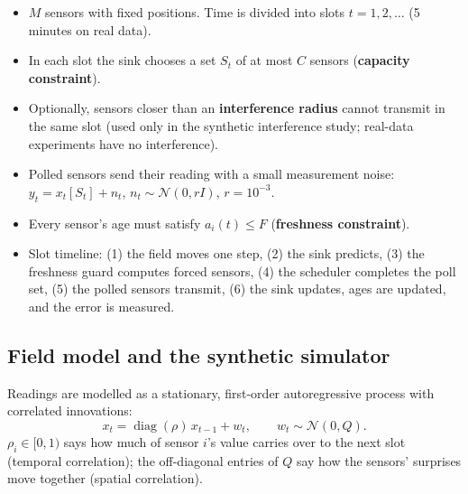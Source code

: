 \begin{itemize}
  \item $M$ sensors with fixed positions. Time is divided into slots $t=1,2,\dots$ (5 minutes on real data).
  \item In each slot the sink chooses a set $S_t$ of at most $C$ sensors (\textbf{capacity constraint}).
  \item Optionally, sensors closer than an \textbf{interference radius} cannot transmit in the same slot (used only in
        the synthetic interference study; real-data experiments have no interference).
  \item Polled sensors send their reading with a small measurement noise: $y_t = x_t[S_t] + n_t$,
        $n_t\sim\mathcal N(0,rI)$, $r=10^{-3}$.
  \item Every sensor's age must satisfy $a_i(t)\le F$ (\textbf{freshness constraint}).
  \item Slot timeline: (1) the field moves one step, (2) the sink predicts, (3) the freshness guard computes forced
        sensors, (4) the scheduler completes the poll set, (5) the polled sensors transmit, (6) the sink updates,
        ages are updated, and the error is measured.
\end{itemize}

\subsection{Field model and the synthetic simulator}

Readings are modelled as a stationary, first-order autoregressive process with correlated innovations:
\[
  x_t = \operatorname{diag}(\rho)\,x_{t-1} + w_t,\qquad w_t\sim\mathcal N(0,Q).
\]
$\rho_i\in[0,1)$ says how much of sensor $i$'s value carries over to the next slot (temporal correlation); the
off-diagonal entries of $Q$ say how the sensors' surprises move together (spatial correlation).

